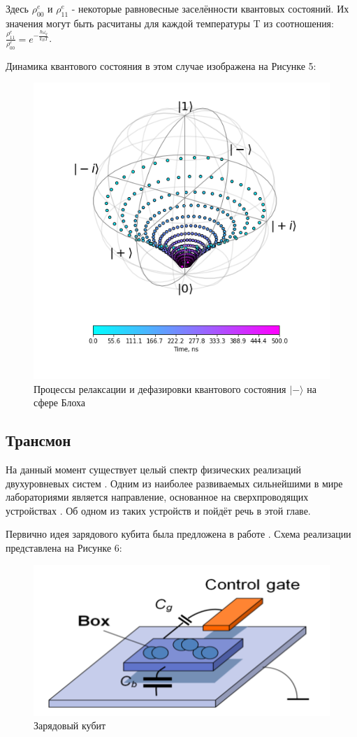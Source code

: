 Здесь $\rho^e_{00}$ и $\rho^e_{11}$ - некоторые равновесные заселённости квантовых состояний. Их значения могут быть расчитаны для каждой температуры T из соотношения: $\frac{\rho^e_{11}}{\rho^e_{00}}=e^{-\frac{\hbar\omega_q}{k_BT}}$.

Динамика квантового состояния в этом случае изображена на Рисунке 5: 
\begin{figure}[!h]
	\centering
	\includegraphics[width=0.4\linewidth]{pictures/Relaxdephase}
	\caption{Процессы релаксации и дефазировки квантового состояния $|-\rangle$ на сфере Блоха}
	\label{fig:relaxdephase}
\end{figure}

\subsection{Трансмон}\label{transmon}

На данный момент существует целый спектр физических реализаций двухуровневых систем \cite{Gershenfeld1997,Jaksch2000,Buluta2011}. Одним из наиболее развиваемых сильнейшими в мире лабораториями является направление, основанное на сверхпроводящих устройствах \cite{Yan2016,Martinis2009,DeGraaf2018}. Об одном из таких устройств и пойдёт речь в этой главе. 

Первично идея зарядового кубита была предложена в работе \cite{Nakamura1999}. Схема реализации представлена на Рисунке 6:
\begin{figure}[h]
	\centering
	\includegraphics[width=0.6\linewidth]{pictures/chargequbit}
	\caption{Зарядовый кубит \cite{Shulga2017}}
	\label{fig:chargequbit}
\end{figure}

